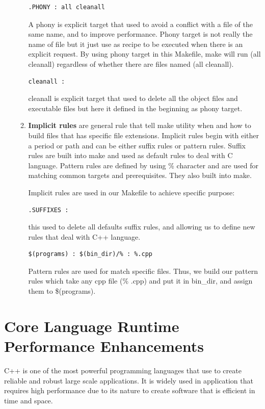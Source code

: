 \documentclass[11pt]{report}
\begin{document}
\begin{enumerate}
\begin{enumerate}
\begin{verbatim}
.PHONY : all cleanall
\end{verbatim}
A phony is explicit target that used to avoid a conflict with a file of the same name, and to improve performance. Phony target is not really the name of file but it just use as recipe to be executed when there is an explicit request. By using phony target in this Makefile, make will run (all cleanall) regardless of whether there are files named (all cleanall).

\begin{verbatim}
cleanall :
\end{verbatim}
cleanall is explicit target that used to delete all the object files and executable files but here it defined in the beginning as phony target.

\item \textbf{Implicit rules} are general rule that tell make utility when and how to build files that has specific file extensions. Implicit rules begin with either a period or path and can be either suffix rules or pattern rules. Suffix rules are built into make and used as default rules to deal with C language.  Pattern rules are defined by using \% character and are used for matching common targets and prerequisites. They also built into make.

Implicit rules are used in our Makefile to achieve specific purpose:

\begin{verbatim}
.SUFFIXES :
\end{verbatim}

this used to delete all defaults suffix rules, and allowing us to define new rules that deal with C++ language.

\begin{verbatim}
$(programs) : $(bin_dir)/% : %.cpp
\end{verbatim}
Pattern rules are used for match specific files. Thus, we build our pattern rules which take any cpp file (\% .cpp) and put it in bin\_dir, and assign them to \$(programs). 

\end{enumerate}
\end{enumerate}


\chapter{Core Language Runtime Performance Enhancements}
\label{chapter: Runtime Performance Enhancements}
C++ is one of the most powerful programming languages that use to create reliable and robust large scale applications. It is widely used in application that requires high performance due to its nature to create software that is efficient in time and space.
\end{document}
